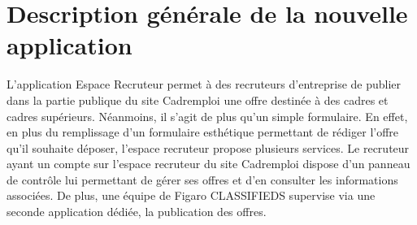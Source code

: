 \section{Description générale de la nouvelle application}
\label{sec:Description generale de l'application}
L'application Espace Recruteur permet à des recruteurs d'entreprise de publier dans la partie publique du site Cadremploi une offre destinée à des cadres et cadres supérieurs.
Néanmoins, il s'agit de plus qu'un simple formulaire.
En effet, en plus du remplissage d'un formulaire esthétique permettant de rédiger l'offre qu'il souhaite déposer, l'espace recruteur propose plusieurs services.
Le recruteur ayant un compte sur l'espace recruteur du site Cadremploi dispose d'un panneau de contrôle lui permettant de gérer ses offres et d'en consulter les informations associées.
De plus, une équipe de Figaro CLASSIFIEDS supervise via une seconde application dédiée, la publication des offres.

